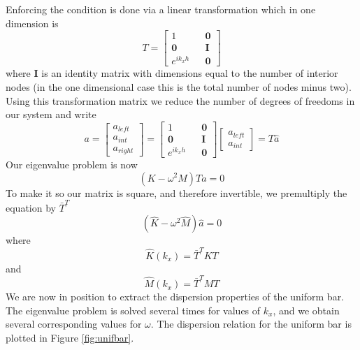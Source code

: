 \documentclass{article}
\begin{document}
Enforcing the condition is done via a linear transformation which in one 
dimension is
\begin{equation}
T = 
\begin{bmatrix}
1 && \mathbf{0} \\
\mathbf{0} && \mathbf{I}\\
e^{ik_xh} && \mathbf{0}
\end{bmatrix}
\end{equation}
where $\mathbf{I}$ is an identity matrix with dimensions equal to the number of 
interior nodes (in the one dimensional case this is the total number of nodes 
minus two). Using this transformation matrix we reduce the number of degrees of 
freedoms in our system and write
\begin{equation}
a =
\begin{bmatrix}
a_{left} \\
a_{int} \\
a_{right}
\end{bmatrix}
= 
\begin{bmatrix}
1 && \mathbf{0} \\
\mathbf{0} && \mathbf{I}\\
e^{ik_xh} && \mathbf{0}
\end{bmatrix}
\begin{bmatrix}
a_{left} \\
a_{int}
\end{bmatrix}
= T \hat{a}
\end{equation}
Our eigenvalue problem is now
\begin{equation}
(K-\omega^2M)T\hat{a} = 0
\end{equation}
To make it so our matrix is square, and therefore invertible, we premultiply 
the equation by $\bar{T}^T$
\begin{equation} \label{evalprob}
(\hat{K} - \omega^2 \hat{M})\hat{a} = 0
\end{equation}
where
\begin{equation}
\hat{K}(k_x) = \bar{T}^T K T
\end{equation}
and 
\begin{equation}
\hat{M}(k_x) = \bar{T}^T M T
\end{equation}
We are now in position to extract the dispersion properties of the uniform bar. 
The eigenvalue problem is solved several times for values of $k_x$, and we 
obtain several corresponding values for $\omega$. The dispersion relation for 
the uniform bar is plotted in Figure \ref{fig:unifbar}.
\end{document}
